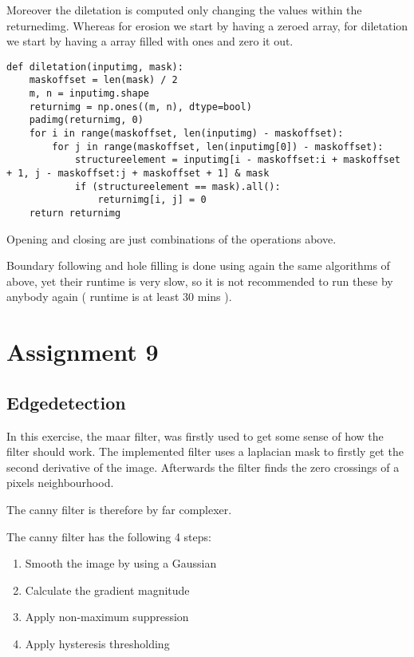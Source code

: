 Moreover the diletation is computed only changing the values within the returnedimg. Whereas for erosion we start by having a zeroed array, for diletation we start by having a array filled with ones and zero it out.
\begin{verbatim}
def diletation(inputimg, mask):
    maskoffset = len(mask) / 2
    m, n = inputimg.shape
    returnimg = np.ones((m, n), dtype=bool)
    padimg(returnimg, 0)
    for i in range(maskoffset, len(inputimg) - maskoffset):
        for j in range(maskoffset, len(inputimg[0]) - maskoffset):
            structureelement = inputimg[i - maskoffset:i + maskoffset + 1, j - maskoffset:j + maskoffset + 1] & mask
            if (structureelement == mask).all():
                returnimg[i, j] = 0
    return returnimg
\end{verbatim}

Opening and closing are just combinations of the operations above.

Boundary following and hole filling is done using again the same algorithms of above, yet their runtime is very slow, so it is not recommended to run these by anybody again ( runtime is at least 30 mins ).

\section{Assignment 9}

\subsection{Edgedetection}

In this exercise, the maar filter, was firstly used to get some sense of how the filter should work. The implemented filter uses a laplacian mask to firstly get the second derivative of the image. Afterwards the filter finds the zero crossings of a pixels neighbourhood.


The canny filter is therefore by far complexer.

The canny filter has the following 4 steps:
\begin{enumerate}
\item Smooth the image by using a Gaussian
\item Calculate the gradient magnitude 
\item Apply non-maximum suppression
\item Apply hysteresis thresholding
\end{enumerate}


